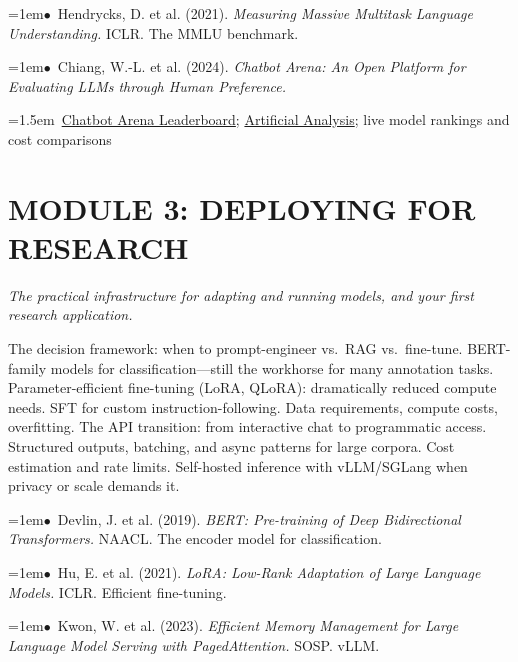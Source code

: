 \documentclass[11pt, a4paper]{article}
\newcommand{\topichead}[1]{%
  \vspace{0.8em}{\large\sffamily\bfseries\textcolor{accent}{#1}}\par\vspace{0.3em}
}
\newcommand{\seclabel}[1]{%
  \vspace{0.5em}{\normalsize\sffamily\bfseries\textcolor{accent}{#1}}\par\vspace{0.2em}
}
\newcommand{\refpaper}[1]{%
  \par\hangindent=1em\hangafter=1\noindent\textcolor{accent}{\small$\bullet$}~{\small #1}\par
}
\newcommand{\resource}[1]{%
  \par\hangindent=1.5em\hangafter=1\noindent\hspace{0.5em}{\small\textcolor{accent}{\guilsinglright}}~{\small #1}\par
}
\begin{document}
\seclabel{Core Readings}

\refpaper{Hendrycks, D. et al. (2021). \textit{Measuring Massive Multitask Language Understanding.} ICLR. The MMLU benchmark.}

\refpaper{Chiang, W.-L. et al. (2024). \textit{Chatbot Arena: An Open Platform for Evaluating LLMs through Human Preference.}}

\seclabel{Further Resources}

\resource{\href{https://huggingface.co/spaces/lmarena-ai/chatbot-arena}{Chatbot Arena Leaderboard}; \href{https://artificialanalysis.ai}{Artificial Analysis}; live model rankings and cost comparisons}


\section{MODULE 3: DEPLOYING FOR RESEARCH}
{\textit{\textcolor{muted}{The practical infrastructure for adapting and running models, and your first research application.}}}

\vspace{1em}

\topichead{Fine-Tuning \& Deployment}

\seclabel{Core Concepts}

The decision framework: when to prompt-engineer vs.\ RAG vs.\ fine-tune. BERT-family models for classification—still the workhorse for many annotation tasks. Parameter-efficient fine-tuning (LoRA, QLoRA): dramatically reduced compute needs. SFT for custom instruction-following. Data requirements, compute costs, overfitting. The API transition: from interactive chat to programmatic access. Structured outputs, batching, and async patterns for large corpora. Cost estimation and rate limits. Self-hosted inference with vLLM/SGLang when privacy or scale demands it.

\seclabel{Core Readings}

\refpaper{Devlin, J. et al. (2019). \textit{BERT: Pre-training of Deep Bidirectional Transformers.} NAACL. The encoder model for classification.}

\refpaper{Hu, E. et al. (2021). \textit{LoRA: Low-Rank Adaptation of Large Language Models.} ICLR. Efficient fine-tuning.}

\refpaper{Kwon, W. et al. (2023). \textit{Efficient Memory Management for Large Language Model Serving with PagedAttention.} SOSP. vLLM.}
\end{document}
